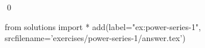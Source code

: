 \begin{ex}
  \label{ex:power-series-1}
  
  \qed
\end{ex}
\begin{python0}
from solutions import *
add(label="ex:power-series-1",
    srcfilename='exercises/power-series-1/answer.tex') 
\end{python0}                              
